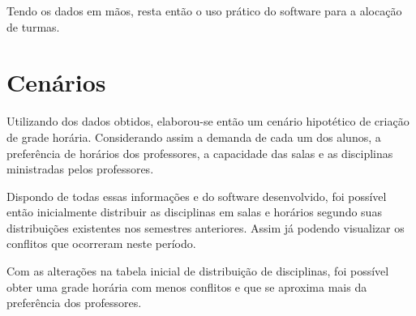 Tendo os dados em mãos, resta então o uso prático do software para a alocação de turmas.

\section{Cenários} %

Utilizando dos dados obtidos, elaborou-se então um cenário hipotético de criação de grade horária. Considerando assim a demanda de cada um dos alunos, a preferência de horários dos professores, a capacidade das salas e as disciplinas ministradas pelos professores.

Dispondo de todas essas informações e do software desenvolvido, foi possível então inicialmente distribuir as disciplinas em salas e horários segundo suas distribuições existentes nos semestres anteriores. Assim já podendo visualizar os conflitos que ocorreram neste período.





Com as alterações na tabela inicial de distribuição de disciplinas, foi possível obter uma grade horária com menos conflitos e que se aproxima mais da preferência dos professores.

